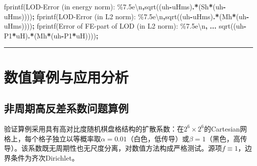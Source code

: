 \documentclass[
]{article}
\newenvironment{Shaded}{\begin{snugshade}}{\end{snugshade}}
\newcommand{\NormalTok}[1]{#1}
\newcommand{\OperatorTok}[1]{\textcolor[rgb]{0.81,0.36,0.00}{\textbf{#1}}}
\newcommand{\SpecialStringTok}[1]{\textcolor[rgb]{0.31,0.60,0.02}{#1}}
\newcommand{\VariableTok}[1]{\textcolor[rgb]{0.00,0.00,0.00}{#1}}
\begin{document}
\begin{Shaded}
\begin{Highlighting}[]
\VariableTok{fprintf}\NormalTok{(}\SpecialStringTok{\textquotesingle{}LOD{-}Error (in energy norm): \%7.5e\textbackslash{}n\textquotesingle{}}\OperatorTok{,}\VariableTok{sqrt}\NormalTok{((}\VariableTok{uh}\OperatorTok{{-}}\VariableTok{uHms}\NormalTok{)}\OperatorTok{.\textquotesingle{}*}\NormalTok{(}\VariableTok{Sh}\OperatorTok{*}\NormalTok{(}\VariableTok{uh}\OperatorTok{{-}}\VariableTok{uHms}\NormalTok{))))}\OperatorTok{;}
\VariableTok{fprintf}\NormalTok{(}\SpecialStringTok{\textquotesingle{}LOD{-}Error (in L2 norm): \%7.5e\textbackslash{}n\textquotesingle{}}\OperatorTok{,}\VariableTok{sqrt}\NormalTok{((}\VariableTok{uh}\OperatorTok{{-}}\VariableTok{uHms}\NormalTok{)}\OperatorTok{.\textquotesingle{}*}\NormalTok{(}\VariableTok{Mh}\OperatorTok{*}\NormalTok{(}\VariableTok{uh}\OperatorTok{{-}}\VariableTok{uHms}\NormalTok{))))}\OperatorTok{;}
\VariableTok{fprintf}\NormalTok{(}\SpecialStringTok{\textquotesingle{}Error of FE{-}part of LOD (in L2 norm): \%7.5e\textbackslash{}n\textquotesingle{}}\OperatorTok{,} \OperatorTok{...}
    \VariableTok{sqrt}\NormalTok{((}\VariableTok{uh}\OperatorTok{{-}}\VariableTok{P1}\OperatorTok{*}\VariableTok{uH}\NormalTok{)}\OperatorTok{.\textquotesingle{}*}\NormalTok{(}\VariableTok{Mh}\OperatorTok{*}\NormalTok{(}\VariableTok{uh}\OperatorTok{{-}}\VariableTok{P1}\OperatorTok{*}\VariableTok{uH}\NormalTok{))))}\OperatorTok{;}
\end{Highlighting}
\end{Shaded}

\begin{center}\rule{0.5\linewidth}{0.5pt}\end{center}

\section{数值算例与应用分析}\label{chap-6}

\subsection{非周期高反差系数问题算例}\label{chap-6-1}

验证算例采用具有高对比度随机棋盘格结构的扩散系数：在\(2^6 \times 2^6\)的Cartesian网格上，每个格子独立以等概率取\(\alpha = 0.01\)（白色，低传导）或\(\beta = 1\)（黑色，高传导）。该系数既无周期性也无尺度分离，对数值方法构成严格测试。源项\(f \equiv 1\)，边界条件为齐次Dirichlet。
\end{document}
